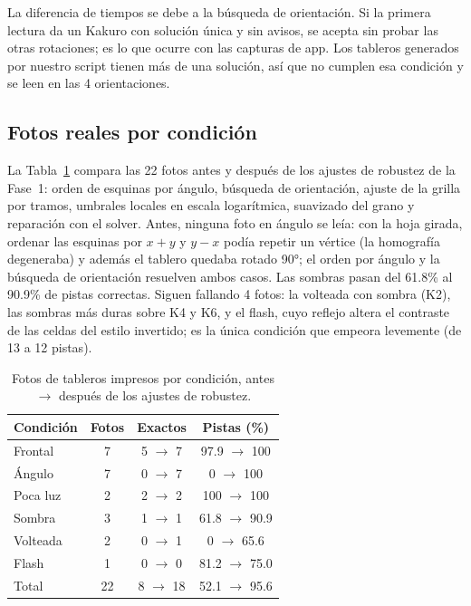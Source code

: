 \documentclass[conference,a4paper]{IEEEtran}
\begin{document}
La diferencia de tiempos se debe a la búsqueda de orientación. Si la primera lectura da un Kakuro con solución única y sin avisos,
se acepta sin probar las otras rotaciones; es lo que ocurre con las capturas de app. Los tableros generados por nuestro script tienen
más de una solución, así que no cumplen esa condición y se leen en las 4 orientaciones.

\subsection{Fotos reales por condición}
La Tabla~\ref{tab:fotos} compara las 22 fotos antes y después de los ajustes de robustez de la Fase~1: orden de esquinas por ángulo,
búsqueda de orientación, ajuste de la grilla por tramos, umbrales locales en escala logarítmica, suavizado del grano y reparación con
el solver. Antes, ninguna foto en ángulo se leía: con la hoja girada, ordenar las esquinas por $x+y$ y $y-x$ podía repetir un vértice
(la homografía degeneraba) y además el tablero quedaba rotado 90°; el orden por ángulo y la búsqueda de orientación resuelven ambos
casos. Las sombras pasan del 61.8\% al 90.9\% de pistas correctas. Siguen fallando 4 fotos: la volteada
con sombra (K2), las sombras más duras sobre K4 y K6, y el flash, cuyo reflejo altera el contraste de las celdas del estilo invertido;
es la única condición que empeora levemente (de 13 a 12 pistas).

\begin{table}[!t]\centering
\caption{Fotos de tableros impresos por condición, antes $\rightarrow$ después de los ajustes de robustez.}
\label{tab:fotos}
\begin{tabular}{lccc}
\toprule
Condición & Fotos & Exactos & Pistas (\%)\\
\midrule
Frontal & 7 & 5 $\rightarrow$ 7 & 97.9 $\rightarrow$ 100\\
Ángulo & 7 & 0 $\rightarrow$ 7 & 0 $\rightarrow$ 100\\
Poca luz & 2 & 2 $\rightarrow$ 2 & 100 $\rightarrow$ 100\\
Sombra & 3 & 1 $\rightarrow$ 1 & 61.8 $\rightarrow$ 90.9\\
Volteada & 2 & 0 $\rightarrow$ 1 & 0 $\rightarrow$ 65.6\\
Flash & 1 & 0 $\rightarrow$ 0 & 81.2 $\rightarrow$ 75.0\\
\midrule
Total & 22 & 8 $\rightarrow$ 18 & 52.1 $\rightarrow$ 95.6\\
\bottomrule
\end{tabular}
\end{table}
\end{document}
